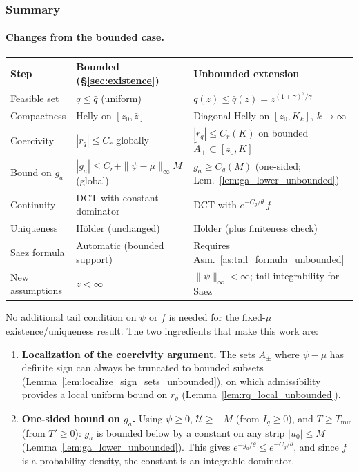 \documentclass[12pt,a4paper]{article}
\theoremstyle{definition}
\theoremstyle{plain}
\theoremstyle{remark}
\newcommand{\zbar}{\bar{z}}
\newcommand{\zlow}{z_{\scriptscriptstyle 0}}
\newcommand{\calU}{\mathcal{U}}
\begin{document}
\subsubsection{Summary}

\paragraph{Changes from the bounded case.}

\begin{center}
\renewcommand{\arraystretch}{1.4}
\begin{tabular}{lll}
\hline
\textbf{Step} & \textbf{Bounded (\S\ref{sec:existence})}
  & \textbf{Unbounded extension} \\
\hline
Feasible set
  & $q \leq \bar q$ (uniform)
  & $q(z) \leq \bar q(z) = z^{(1+\gamma)^2/\gamma}$ \\
Compactness
  & Helly on $[\zlow, \zbar]$
  & Diagonal Helly on $[\zlow, K_k]$, $k \to \infty$ \\
Coercivity
  & $|r_q| \leq C_r$ globally
  & $|r_q| \leq C_r(K)$ on bounded $\widetilde A_\pm
    \subset [\zlow, K]$ \\
Bound on $g_a$
  & $|g_a| \leq C_r + \|\psi{-}\mu\|_\infty M$ (global)
  & $g_a \geq C_g(M)$ (one-sided;
    Lem.~\ref{lem:ga_lower_unbounded}) \\
Continuity
  & DCT with constant dominator
  & DCT with $e^{-C_g/\theta}\,f$ \\
Uniqueness
  & H\"older (unchanged)
  & H\"older (plus finiteness check) \\
Saez formula
  & Automatic (bounded support)
  & Requires Asm.~\ref{as:tail_formula_unbounded} \\
\hline
New assumptions
  & $\zbar < \infty$
  & $\|\psi\|_\infty < \infty$;
    tail integrability for Saez \\
\hline
\end{tabular}
\end{center}

No additional tail condition on $\psi$ or $f$ is needed for
the fixed-$\mu$ existence/uniqueness result.  The two
ingredients that make this work are:
\begin{enumerate}
\item \textbf{Localization of the coercivity argument.}
  The sets $A_\pm$ where $\psi - \mu$ has definite sign
  can always be truncated to bounded subsets
  (Lemma~\ref{lem:localize_sign_sets_unbounded}), on which
  admissibility provides a local uniform bound on $r_q$
  (Lemma~\ref{lem:rq_local_unbounded}).

\item \textbf{One-sided bound on $g_a$.}
  Using $\psi \geq 0$, $\calU \geq -M$ (from
  $I_q \geq 0$), and $T \geq T_{\min}$ (from
  $T' \geq 0$): $g_a$ is bounded below by a constant on
  any strip $|u_0| \leq M$
  (Lemma~\ref{lem:ga_lower_unbounded}).  This gives
  $e^{-g_a/\theta} \leq e^{-C_g/\theta}$, and since $f$
  is a probability density, the constant is an integrable
  dominator.
\end{enumerate}
\end{document}
